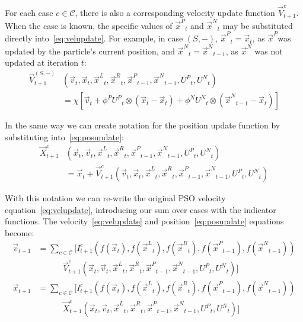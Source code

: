 \documentclass{llncs}
\newcommand{\parens}[1]{\!\left(#1\right)}
\providecommand{\pers}{\ensuremath{P}}
\providecommand{\neigh}{\ensuremath{N}}
\providecommand{\leftind}{\ensuremath{L}}
\providecommand{\rightind}{\ensuremath{R}}
\providecommand{\nURand}{\ensuremath{U^\neigh}}
\providecommand{\pURand}{\ensuremath{U^\pers}}
\providecommand{\ppos}{\ensuremath{\Vec{x}}}
\providecommand{\pvel}{\ensuremath{\Vec{v}}}
\providecommand{\nbest}{\ensuremath{\Vec{x}^\neigh}}
\providecommand{\pbest}{\ensuremath{\Vec{x}^\pers}}
\providecommand{\constriction}{\ensuremath{\chi}}
\providecommand{\ncoeff}{\ensuremath{\phi^\neigh}}
\providecommand{\pcoeff}{\ensuremath{\phi^\pers}}
\providecommand{\ofunc}{\ensuremath{f}}
\providecommand{\indic}{\ensuremath{I}}
\providecommand{\specvel}{\ensuremath{\vec{V}}}
\providecommand{\specpos}{\ensuremath{\vec{X}}}
\providecommand{\leftn}{\ensuremath{\Vec{x}^\leftind}}
\providecommand{\rightn}{\ensuremath{\Vec{x}^\rightind}}
\providecommand{\caseset}{\ensuremath{\mathcal{C}}}
\providecommand{\casegen}{\ensuremath{c}}
\providecommand{\casexn}{\ensuremath{(S,-)}}
\begin{document}
For each case $\casegen \in \caseset$, there is also a corresponding
velocity update function $\specvel_{t+1}^{\casegen}$.  When the case is
known, the specific values of $\pbest_t$ and $\nbest_t$ may be substituted
directly into~\eqref{eq:velupdate}.  For example, in case $\casexn$,
$\pbest_{t}=\ppos_{t}$, as \pbest was updated by the particle's current
position, and $\nbest_{t}=\nbest_{t-1}$, as $\nbest$ was not updated at
iteration $t$:
\begin{align}
\nonumber
	\specvel_{t+1}^{\casexn} & \parens{\pvel_t, \ppos_{t}, \leftn_{t}, \rightn_{t},
	\pbest_{t-1}, \nbest_{t-1}, \pURand_{t}, \nURand_{t}} \\
\label{eq:defvcasexn}
		&= \constriction \left[ \pvel_{t} +
			\pcoeff\pURand_{t}\otimes\parens{\ppos_{t} - \ppos_{t}}
			+ \ncoeff\nURand_{t}\otimes\parens{\nbest_{t-1} -
			\ppos_{t}} \right]
\end{align}

In the same way we can create notation for the position update function by
substituting into~\eqref{eq:posupdate}:
\begin{align}
    \nonumber
	\specpos_{t+1}^{\casegen} & \parens{\ppos_{t}, \pvel_{t}, \leftn_{t},
	\rightn_{t} ,\pbest_{t-1} ,\nbest_{t-1}, \pURand_{t}, \nURand_{t}}
        \\
    \label{eq:defpcasegen}
        &=
	\ppos_{t} + \specvel_{t+1}^{\casegen}
	\parens{\pvel_t, \ppos_{t}, \leftn_{t}, \rightn_{t},
	\pbest_{t-1}, \nbest_{t-1}, \pURand_{t}, \nURand_{t}}
\end{align}

With this notation we can re-write the original PSO velocity
equation~\eqref{eq:velupdate}, introducing our sum over cases with the
indicator functions.
The velocity~\eqref{eq:velupdate} and position~\eqref{eq:posupdate} equations become:
\begin{align}
\nonumber
  \pvel_{t+1} &= \sum_{c \in \caseset} \bigl[
	\indic_{t+1}^{c}\parens{
	  \ofunc\parens{\ppos_{t}},
	  \ofunc\parens{\leftn_{t}},
	  \ofunc\parens{\rightn_{t}},
	  \ofunc\parens{\pbest_{t-1}},
	  \ofunc\parens{\nbest_{t-1}}
	  } \\
\label{eq:specvelupdate}
	& \quad \quad \quad \specvel_{t+1}^{c}\parens{
	  \ppos_{t},
	  \pvel_{t},
	  \leftn_{t},
	  \rightn_{t},
	  \pbest_{t-1},
	  \nbest_{t-1},
	  \pURand_{t},
	  \nURand_{t}
	  }\bigr]
\\
\nonumber
  \ppos_{t+1} &= \sum_{c \in \caseset} \bigl[
	\indic_{t+1}^{c}\parens{
	  \ofunc\parens{\ppos_{t}},
	  \ofunc\parens{\leftn_{t}},
	  \ofunc\parens{\rightn_{t}},
	  \ofunc\parens{\pbest_{t-1}},
	  \ofunc\parens{\nbest_{t-1}}
	  } \\
\label{eq:specposupdate}
	& \quad \quad \quad \specpos_{t+1}^{c}\parens{
	  \ppos_{t},
	  \pvel_{t},
	  \leftn_{t},
	  \rightn_{t},
	  \pbest_{t-1},
	  \nbest_{t-1},
	  \pURand_{t},
	  \nURand_{t}
	  }\bigr]
\end{align}
\end{document}
